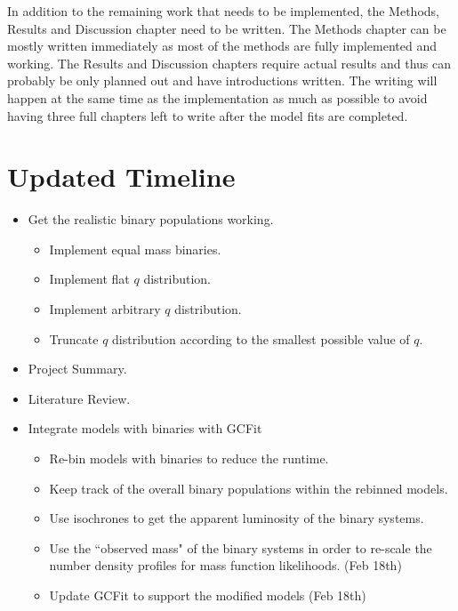 \documentclass[12pt,letterpaper]{article}
\begin{document}
In addition to the remaining work that needs to be implemented, the Methods, Results and Discussion
chapter need to be written. The Methods chapter can be mostly written immediately as most of  the
methods are fully implemented and working. The Results and Discussion chapters require actual
results and thus can probably be only planned out and have introductions written. The writing will
happen at the same time as the implementation as much as possible to avoid having three full
chapters left to write after the model fits are completed.



\section{Updated Timeline}
\begin{itemize}
	\item Get the realistic binary populations working. \checkmark
	      \begin{itemize}
		      \item Implement equal mass binaries. \checkmark
		      \item Implement flat $q$ distribution. \checkmark
		      \item Implement arbitrary $q$ distribution. \checkmark
		      \item Truncate $q$ distribution according to the smallest possible value of $q$. \checkmark
	      \end{itemize}
	\item Project Summary. \checkmark
	\item Literature Review. \checkmark
	\item Integrate models with binaries with GCFit
	      \begin{itemize}
		      \item Re-bin models with binaries to reduce the runtime. \checkmark
		      \item Keep track of the overall binary populations within the rebinned models. \checkmark
		      \item Use isochrones to get the apparent luminosity of the binary systems. \checkmark
		      \item Use the ``observed mass" of the binary systems in order to re-scale the
		            number density profiles for mass function likelihoods. (Feb 18th)
		      \item Update GCFit to support the modified models (Feb 18th)
	      \end{itemize}


\end{itemize}
\end{document}
